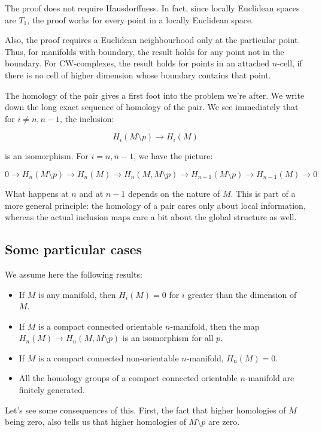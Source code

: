 \documentclass[a4paper]{amsart}
\begin{document}
The proof does not require Hausdorffness. In fact, since locally
Euclidean spaces are $T_1$, the proof works for every point in a
locally Euclidean space.

Also, the proof requires a Euclidean neighbourhood only at the
particular point. Thus, for manifolds with boundary, the result holds
for any point not in the boundary. For CW-complexes, the result holds
for points in an attached $n$-cell, if there is no cell of higher
dimension whose boundary contains that point.

The homology of the pair gives a first foot into the problem we're
after. We write down the long exact sequence of homology of the
pair. We see immediately that for $i \ne n, n-1$, the inclusion:

$$H_i(M \setminus p) \to H_i(M)$$

is an isomorphism. For $i = n,n-1$, we have the picture:

$$0 \to H_n(M \setminus p) \to H_n(M) \to H_n(M,M \setminus p) \to H_{n-1}(M \setminus p) \to H_{n-1}(M) \to 0$$

What happens at $n$ and at $n-1$ depends on the nature of $M$. This is
part of a more general principle: the homology of a pair cares only
about local information, whereas the actual inclusion maps care a bit
about the global structure as well.

\subsection{Some particular cases}

We assume here the following results:

\begin{itemize}

\item If $M$ is any manifold, then $H_i(M) = 0$ for $i$ greater than
  the dimension of $M$.
\item If $M$ is a compact connected orientable $n$-manifold, then the map
  $H_n(M) \to H_n(M, M \setminus p)$ is an isomorphism for all $p$.

\item If $M$ is a compact connected non-orientable $n$-manifold, $H_n(M) =
  0$.

\item All the homology groups of a compact connected orientable
  $n$-manifold are finitely generated.
\end{itemize}

Let's see some consequences of this. First, the fact that higher
homologies of $M$ being zero, also tells us that higher homologies of
$M \setminus p$ are zero.
\end{document}
